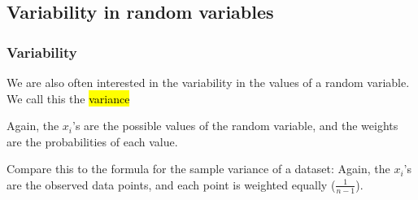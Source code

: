 \documentclass[slidestop,compress,mathserif]{beamer}
\begin{document}

\subsection{Variability in random variables}


\begin{frame}
\frametitle{Variability}

We are also often interested in the variability in the values of a random variable. We call this the \hl{variance}

\formula{
\[ \sigma^2 = Var(X) = \sum_{i = 1}^k (x_i - E(X))^2 P(X = x_i) \]
\[ \sigma = SD(X) = \sqrt{Var(X)} \]
}
Again, the $x_i$'s are the possible values of the random variable, and the weights are the probabilities of each value.

\pause
\begin{small}
Compare this to the formula for the sample variance of a dataset:
\formula{\[ s^2 = \frac{1}{n-1} \sum_{i = 1}^n (x_i - \bar{x})^2 \]}
Again, the $x_i$'s are the observed data points, and each point is weighted equally ($\frac{1}{n-1}$).
\end{small}

\end{frame}

\end{document}
